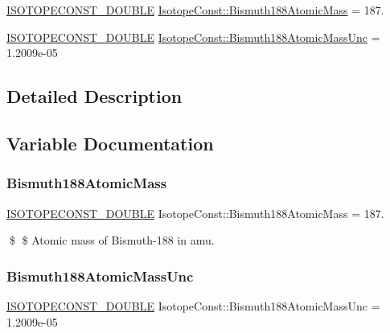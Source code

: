 \begin{DoxyCompactItemize}
\item 
\mbox{\hyperlink{group___isotope_const-_macros_ga8f45a7272ce02c0b4c65c44636ed719a}{I\+S\+O\+T\+O\+P\+E\+C\+O\+N\+S\+T\+\_\+\+D\+O\+U\+B\+LE}} \mbox{\hyperlink{group___isotope_const-_bismuth-_bi188_ga82254f380e8bb737571090313fe3a1b6}{Isotope\+Const\+::\+Bismuth188\+Atomic\+Mass}} = 187.
\item 
\mbox{\hyperlink{group___isotope_const-_macros_ga8f45a7272ce02c0b4c65c44636ed719a}{I\+S\+O\+T\+O\+P\+E\+C\+O\+N\+S\+T\+\_\+\+D\+O\+U\+B\+LE}} \mbox{\hyperlink{group___isotope_const-_bismuth-_bi188_ga5a3d2bb47f1a6e3600ab5000fde8182b}{Isotope\+Const\+::\+Bismuth188\+Atomic\+Mass\+Unc}} = 1.\+2009e-\/05
\end{DoxyCompactItemize}


\subsection{Detailed Description}


\subsection{Variable Documentation}
\mbox{\label{group___isotope_const-_bismuth-_bi188_ga82254f380e8bb737571090313fe3a1b6}} 
\subsubsection{\texorpdfstring{Bismuth188\+Atomic\+Mass}{Bismuth188AtomicMass}}
{\footnotesize\ttfamily \mbox{\hyperlink{group___isotope_const-_macros_ga8f45a7272ce02c0b4c65c44636ed719a}{I\+S\+O\+T\+O\+P\+E\+C\+O\+N\+S\+T\+\_\+\+D\+O\+U\+B\+LE}} Isotope\+Const\+::\+Bismuth188\+Atomic\+Mass = 187.}

\$ \$ Atomic mass of Bismuth-\/188 in amu. \mbox{\label{group___isotope_const-_bismuth-_bi188_ga5a3d2bb47f1a6e3600ab5000fde8182b}} 
\subsubsection{\texorpdfstring{Bismuth188\+Atomic\+Mass\+Unc}{Bismuth188AtomicMassUnc}}
{\footnotesize\ttfamily \mbox{\hyperlink{group___isotope_const-_macros_ga8f45a7272ce02c0b4c65c44636ed719a}{I\+S\+O\+T\+O\+P\+E\+C\+O\+N\+S\+T\+\_\+\+D\+O\+U\+B\+LE}} Isotope\+Const\+::\+Bismuth188\+Atomic\+Mass\+Unc = 1.\+2009e-\/05}

